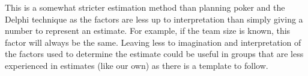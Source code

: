 This is a somewhat stricter estimation method than planning poker and the Delphi technique as the factors are less up to interpretation than simply giving a number to represent an estimate. For example, if the team size is known, this factor will always be the same. Leaving less to imagination and interpretation of the factors used to determine the estimate could be useful in groups that are less experienced in estimates (like our own) as there is a template to follow.
